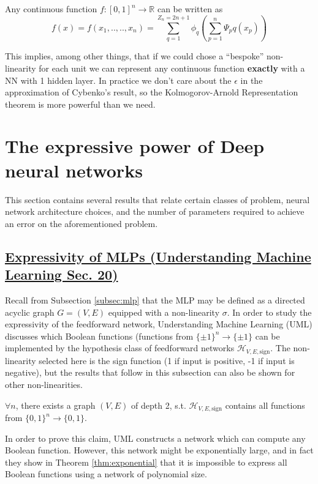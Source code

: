 \documentclass{article}
\begin{document}
\begin{thm}
Any continuous function $f :[0,1]^n \xrightarrow{} \mathbb{R}$ can be written as 
$$ f(x) =f(x_1,..,..,x_n) =  \sum_{q=1}^{Z_n = 2n+1} \phi_q\left(\sum_{p=1}^{n} \Psi_pq(x_p)\right) $$
\end{thm}
This implies, among other things, that if we could chose a ``bespoke'' non-linearity for each unit we can represent any continuous function \textbf{exactly} with a NN with 1 hidden layer. In practice we don't care about the $\epsilon$ in the approximation of Cybenko's result, so the Kolmogorov-Arnold Representation theorem is more powerful than we need.


\section{The expressive power of Deep neural networks}
\label{sec:expressive-dnns}
This section contains several results that relate certain classes of problem, neural network architecture choices, and the number of parameters required to achieve an error on the aforementioned problem. 

\subsection{\href{https://www.cs.huji.ac.il/~shais/UnderstandingMachineLearning/understanding-machine-learning-theory-algorithms.pdf}{Expressivity of MLPs (Understanding Machine Learning Sec. 20)}}
Recall from Subsection \ref{subsec:mlp} that the MLP may be defined as a directed acyclic graph $G = (V, E)$ equipped with a non-linearity $\sigma$. In order to study the expressivity of the feedforward network, Understanding Machine Learning (UML) \citep{Shalev-Shwartz:2014:UML:2621980} discusses which Boolean functions (functions from $\{\pm 1\}^n \to \{\pm 1\}$ can be implemented by the hypothesis class of feedforward networks $\mathcal{H}_{V, E, \text{sign}}$. The non-linearity selected here is the sign function (1 if input is positive, -1 if input is negative), but the results that follow in this subsection can also be shown for other non-linearities.

\begin{clm}
$\forall n$, there exists a graph $(V, E)$ of depth 2, s.t. $\mathcal{H}_{V, E, \text{sign}}$ contains all functions from $\{0, 1\}^n \to \{0, 1\}$.
\end{clm}

In order to prove this claim, UML \citep{Shalev-Shwartz:2014:UML:2621980} constructs a network which can compute any Boolean function. However, this network might be exponentially large, and in fact they show in Theorem \ref{thm:exponential} that it is impossible to express all Boolean functions using a network of polynomial size.
\end{document}
